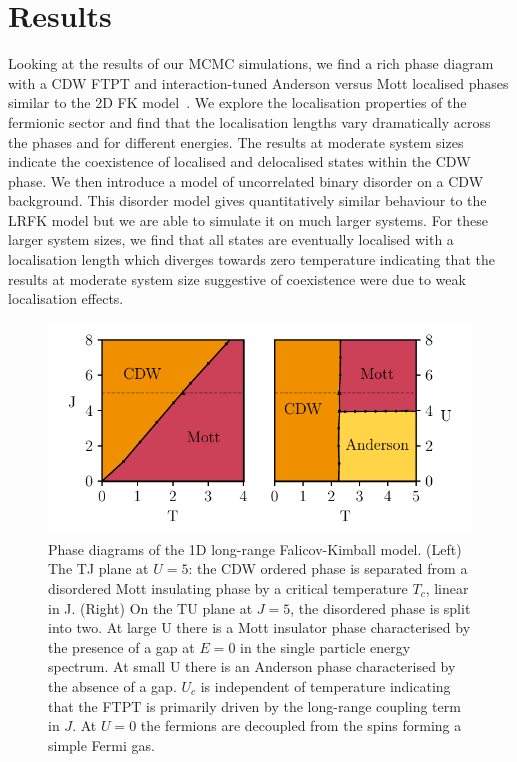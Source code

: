 \hypertarget{sec:lrfk-results}{%
\section{Results}\label{sec:lrfk-results}}

Looking at the results of our MCMC simulations, we find a rich phase diagram with a CDW FTPT and interaction-tuned Anderson versus Mott localised phases similar to the 2D FK model~\autocite{antipovInteractionTunedAndersonMott2016}. We explore the localisation properties of the fermionic sector and find that the localisation lengths vary dramatically across the phases and for different energies. The results at moderate system sizes indicate the coexistence of localised and delocalised states within the CDW phase. We then introduce a model of uncorrelated binary disorder on a CDW background. This disorder model gives quantitatively similar behaviour to the LRFK model but we are able to simulate it on much larger systems. For these larger system sizes, we find that all states are eventually localised with a localisation length which diverges towards zero temperature indicating that the results at moderate system size suggestive of coexistence were due to weak localisation effects.

\hypertarget{fig:phase-diagram-lrfk}{%
\begin{figure}
\centering
\includegraphics[width=1\textwidth,height=\textheight]{figure_code/fk_chapter/phase_diagram/phase_diagram}
\caption[{Long-Range Falicov Kimball Model Phase Diagram}]{Phase diagrams of the 1D long-range Falicov-Kimball model. (Left) The TJ plane at \(U = 5\): the CDW ordered phase is separated from a disordered Mott insulating phase by a critical temperature \(T_c\), linear in J. (Right) On the TU plane at \(J = 5\), the disordered phase is split into two. At large U there is a Mott insulator phase characterised by the presence of a gap at \(E=0\) in the single particle energy spectrum. At small U there is an Anderson phase characterised by the absence of a gap. \(U_c\) is independent of temperature indicating that the FTPT is primarily driven by the long-range coupling term in \(J\). At \(U = 0\) the fermions are decoupled from the spins forming a simple Fermi gas.}
\label{fig:phase-diagram-lrfk}
\end{figure}
}

